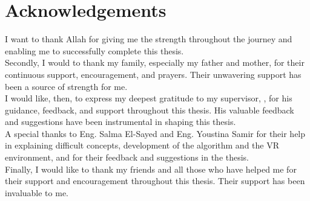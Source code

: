 \chapter*{Acknowledgements}
\label{chap:ack}

I want to thank Allah for giving me the strength throughout the journey and enabling me to successfully complete this thesis.\\

Secondly, I would to thank my family, especially my father and mother, for their continuous support, encouragement, and prayers. Their unwavering support has been a source of strength for me.\\

I would like, then, to express my deepest gratitude to my supervisor, \supervisorOne, for his guidance, feedback, and support throughout this thesis. His valuable feedback and suggestions have been instrumental in shaping this thesis.\\

A special thanks to Eng. Salma El-Sayed and Eng. Youstina Samir for their help in explaining difficult concepts, development of the algorithm and the VR environment, and for their feedback and suggestions in the thesis.\\

Finally, I would like to thank my friends and all those who have helped me for their support and encouragement throughout this thesis. Their support has been invaluable to me.